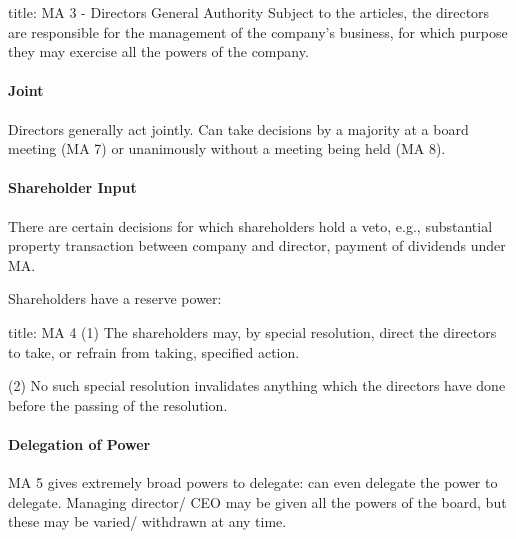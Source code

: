 \documentclass[
]{article}
\newenvironment{Shaded}{}{}
\newcommand{\NormalTok}[1]{#1}
\begin{document}
\begin{Shaded}
\begin{Highlighting}[]
\NormalTok{title: MA 3 {-} Directors\textquotesingle{} General Authority}
\NormalTok{Subject to the articles, the directors are responsible for the management of the company’s business, for which purpose they may exercise all the powers of the company.}
\end{Highlighting}
\end{Shaded}

\hypertarget{joint}{%
\paragraph{Joint}\label{joint}}

Directors generally act jointly. Can take decisions by a majority at a
board meeting (MA 7) or unanimously without a meeting being held (MA 8).

\hypertarget{shareholder-input}{%
\paragraph{Shareholder Input}\label{shareholder-input}}

There are certain decisions for which shareholders hold a veto, e.g.,
substantial property transaction between company and director, payment
of dividends under MA.

Shareholders have a reserve power:

\begin{Shaded}
\begin{Highlighting}[]
\NormalTok{title: MA 4}
\NormalTok{(1) The shareholders may, by special resolution, direct the directors to take, or refrain from taking, specified action.}

\NormalTok{(2) No such special resolution invalidates anything which the directors have done before the passing of the resolution.}
\end{Highlighting}
\end{Shaded}

\hypertarget{delegation-of-power}{%
\paragraph{Delegation of Power}\label{delegation-of-power}}

MA 5 gives extremely broad powers to delegate: can even delegate the
power to delegate. Managing director/ CEO may be given all the powers of
the board, but these may be varied/ withdrawn at any time.
\end{document}
